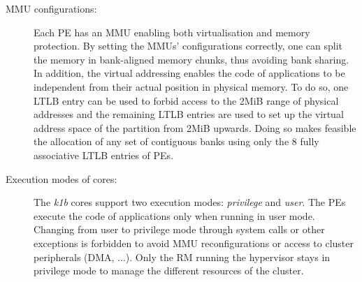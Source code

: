 \documentclass[main.tex]{subfiles}
\begin{document}
\begin{description}
    \item[MMU configurations: ] Each PE has an MMU enabling both virtualisation and memory protection. By setting the MMUs' configurations correctly, one can split the memory in bank-aligned memory chunks, thus avoiding bank sharing. In addition, the virtual addressing enables the code of applications to be independent from their actual position in physical memory. To do so, one LTLB entry can be used to forbid access to the 2MiB range of physical addresses and the remaining LTLB entries are used to set up the virtual address space of the partition from 2MiB upwards. Doing so makes feasible the allocation of any set of contiguous banks using only the 8 fully associative LTLB entries of PEs.
    \item[Execution modes of cores: ] The \emph{k1b} cores support two execution modes: \emph{privilege} and \emph{user}. The PEs execute the code of applications only when running in user mode. Changing from user to privilege mode through system calls or other exceptions is forbidden to avoid MMU reconfigurations or access to cluster peripherals (DMA, ...). Only the RM running the hypervisor stays in privilege mode to manage the different resources of the cluster.

\end{description}
\end{document}
